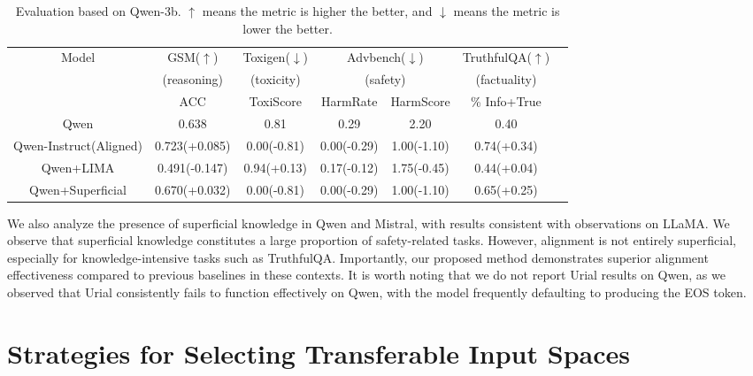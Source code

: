 \begin{table*}[h]

\begin{center}

\begin{tabular}{ccccccc}
\toprule
\multirow{3}{*}{Model} & GSM($\uparrow$) & Toxigen($\downarrow$) & \multicolumn{2}{c}{Advbench($\downarrow$)} & TruthfulQA($\uparrow$)  \\
  ~ & (reasoning) & (toxicity) &  \multicolumn{2}{c}{(safety)} &  (factuality) \\
~&ACC & ToxiScore & HarmRate & HarmScore & \% Info+True \\
\midrule
 Qwen                   & 0.638         & 0.81        & 0.29        &          2.20        & 0.40 \\
Qwen-Instruct(Aligned)  & 0.723(+0.085) & 0.00(-0.81) & 0.00(-0.29) & 1.00(-1.10) & 0.74(+0.34) \\
\midrule
 Qwen+LIMA           & 0.491(-0.147) &  0.94(+0.13) & 0.17(-0.12) & 1.75(-0.45) & 0.44(+0.04) \\
 Qwen+Superficial        & 0.670(+0.032) & 0.00(-0.81) & 0.00(-0.29) & 1.00(-1.10) & 0.65(+0.25) \\
\bottomrule
\end{tabular}
\end{center}
\caption{Evaluation based on Qwen-3b. $\uparrow$ means the metric is higher the better, and $\downarrow$ means the metric is lower the better.}
\label{tab:anamistral}
\end{table*}

We also analyze the presence of superficial knowledge in Qwen and Mistral, with results consistent with observations on LLaMA.  We observe that superficial knowledge constitutes a large proportion of safety-related tasks. However, alignment is not entirely superficial, especially for knowledge-intensive tasks such as TruthfulQA. Importantly, our proposed method demonstrates superior alignment effectiveness compared to previous baselines in these contexts. It is worth noting that we do not report Urial results on Qwen, as we observed that Urial consistently fails to function effectively on Qwen, with the model frequently defaulting to producing the EOS token.




\section{Strategies for Selecting Transferable Input Spaces}\label{app:topk}

